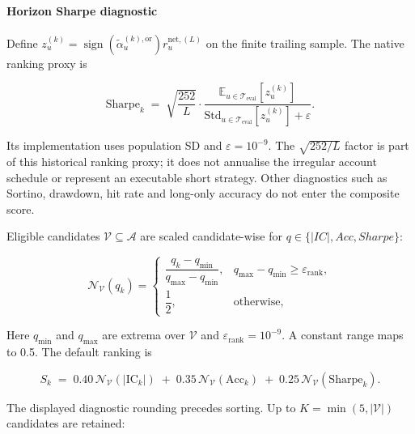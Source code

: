 \paragraph{Horizon Sharpe diagnostic}
Define $z^{(k)}_u=\operatorname{sign}(\tilde{\alpha}^{(k),\mathrm{or}}_u)r^{\mathrm{net},(L)}_u$ on the finite trailing sample. The native ranking proxy is

\begin{equation}
    \mathrm{Sharpe}_k \;=\;
    \sqrt{\frac{252}{L}} \cdot
    \frac{
        \mathbb{E}_{u\in\mathcal{T}_{\mathrm{eval}}}\!\left[z^{(k)}_u\right]
    }{
        \mathrm{Std}_{u\in\mathcal{T}_{\mathrm{eval}}}\!\left[z^{(k)}_u\right]
        + \varepsilon
    }.
    \label{eq:sharpe}
\end{equation}


Its implementation uses population SD and $\varepsilon=10^{-9}$. The $\sqrt{252/L}$ factor is part of this historical ranking proxy; it does not annualise the irregular account schedule or represent an executable short strategy. Other diagnostics such as Sortino, drawdown, hit rate and long-only accuracy do not enter the composite score.

Eligible candidates $\mathcal{V}\subseteq\mathcal{A}$ are scaled candidate-wise for $q\in\{|IC|,Acc,Sharpe\}$:

\begin{equation}
    \mathcal{N}_{\mathcal{V}}(q_k) =
    \begin{cases}
        \dfrac{q_k-q_{\min}}{q_{\max}-q_{\min}},
        & q_{\max}-q_{\min} \geq \varepsilon_{\mathrm{rank}},\\[6pt]
        \dfrac{1}{2}, & \text{otherwise},
    \end{cases}
    \label{eq:candidate_minmax}
\end{equation}


Here $q_{\min}$ and $q_{\max}$ are extrema over $\mathcal{V}$ and $\varepsilon_{\mathrm{rank}}=10^{-9}$. A constant range maps to 0.5. The default ranking is

\begin{equation}
    S_k \;=\;
    0.40\,\mathcal{N}_{\mathcal{V}}(|\mathrm{IC}_k|)
    \;+\; 0.35\,\mathcal{N}_{\mathcal{V}}(\mathrm{Acc}_k)
    \;+\; 0.25\,\mathcal{N}_{\mathcal{V}}(\mathrm{Sharpe}_k).
    \label{eq:composite}
\end{equation}


The displayed diagnostic rounding precedes sorting. Up to $K=\min(5,|\mathcal{V}|)$ candidates are retained:


